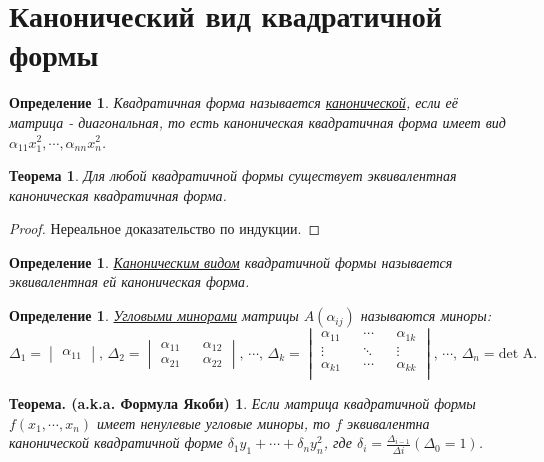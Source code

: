 \documentclass[../../main.tex]{subfiles}
\begin{document}
\section{Канонический вид квадратичной формы}


\newtheorem*{CanonicalDef}{Определение}
\begin{CanonicalDef}
Квадратичная форма называется \underline{канонической}, если её матрица - диагональная,
то есть каноническая квадратичная форма имеет вид $\alpha_{1 1} x^{2}_{1}, \cdots, \alpha_{n n} x^{2}_{n}$.
\end{CanonicalDef}

\newtheorem*{CanonicalViewTheorem}{Теорема}
\begin{CanonicalViewTheorem}
Для любой квадратичной формы существует эквивалентная каноническая квадратичная форма.
\end{CanonicalViewTheorem}
\begin{proof}
Нереальное доказательство по индукции.
\end{proof}

\newtheorem*{CanonicalViewDef}{Определение}
\begin{CanonicalViewDef}
\underline{Каноническим видом} квадратичной формы называется эквивалентная ей каноническая форма.
\end{CanonicalViewDef}

\newtheorem*{AngleMinorsDef}{Определение}
\begin{AngleMinorsDef}
\underline{Угловыми минорами} матрицы $ A(\alpha_{i j}) $ называются миноры:
\[
\Delta_{1} =
\begin{vmatrix}
  \alpha_{1 1}
\end{vmatrix}
\text{, }
\Delta_{2} =
\begin{vmatrix}
  \alpha_{1 1} && \alpha_{1 2} \\
  \alpha_{2 1} && \alpha_{2 2}
\end{vmatrix}
\text{, }
\cdots
\text{, }
\Delta_{k} =
  \begin{vmatrix}
    \alpha_{1 1} && \cdots && \alpha_{1 k}    \\
    \vdots && \ddots && \vdots                \\
    \alpha_{k 1} && \cdots && \alpha_{k k}    \\
  \end{vmatrix}
\text{, }
\cdots
\text{, }
\Delta_{n} = \text{det A.}
\]
\end{AngleMinorsDef}

\newtheorem*{YakobyTh}{Теорема. (a.k.a. Формула Якоби)}
\begin{YakobyTh}
Если матрица квадратичной формы $f(x_{1}, \cdots, x_{n})$ имеет ненулевые угловые миноры, то
$f$ эквивалентна канонической квадратичной форме $\delta_{1} y_{1} + \cdots + \delta_{n} y^{2}_{n}$,
где $\delta_{i} = \frac{\Delta_{i - 1}}{\Delta{i}} (\Delta_{0} = 1)$.
\end{YakobyTh}
\end{document}
